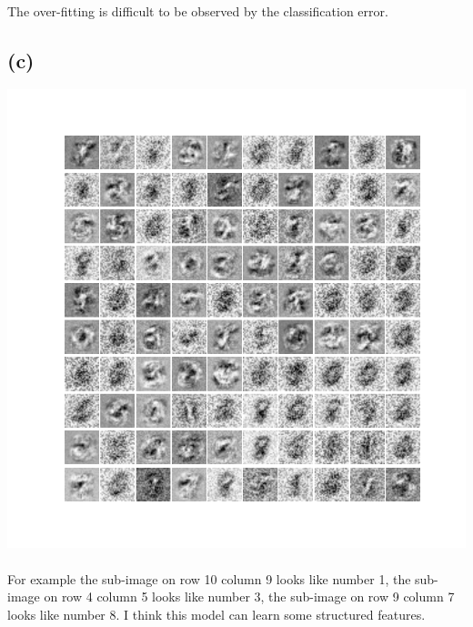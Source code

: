\documentclass[twoside]{article}
\begin{document}
\paragraph{} The over-fitting is difficult to be observed by the classification error.


\subsection{(c)}
\includegraphics[width=0.5\linewidth]{images/problem_c}
\paragraph{} For example the sub-image on row 10 column 9 looks like number 1, the sub-image on row 4 column 5 looks like number 3, the sub-image on row 9 column 7 looks like number 8. I think this model can learn some structured  features.
\end{document}
